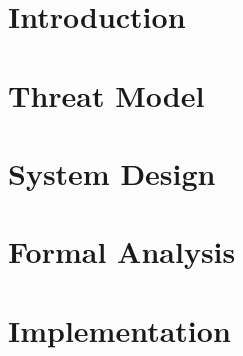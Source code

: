 \documentclass[conference]{IEEEtran}
\begin{document}

\section{Introduction}\label{sec:intro}




\section{Threat Model}\label{sec:threat-model}




\section{System Design}\label{sec:design}




\section{Formal Analysis}\label{sec:formal}




\section{Implementation}\label{sec:implementation}
\end{document}
